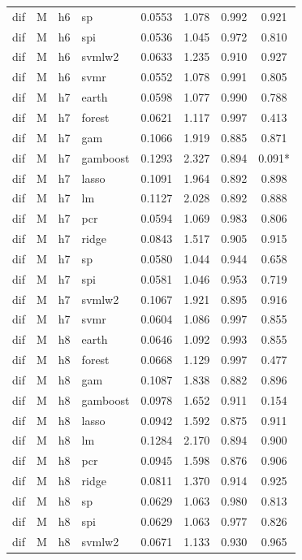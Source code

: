 \begin{ThreePartTable}
\begin{longtable}[t]{llclcccc}
dif & M & h6 & sp & 0.0553 & 1.078 & 0.992 & 0.921\\
dif & M & h6 & spi & 0.0536 & 1.045 & 0.972 & 0.810\\
dif & M & h6 & svmlw2 & 0.0633 & 1.235 & 0.910 & 0.927\\
dif & M & h6 & svmr & 0.0552 & 1.078 & 0.991 & 0.805\\
\addlinespace
dif & M & h7 & earth & 0.0598 & 1.077 & 0.990 & 0.788\\
dif & M & h7 & forest & 0.0621 & 1.117 & 0.997 & 0.413\\
dif & M & h7 & gam & 0.1066 & 1.919 & 0.885 & 0.871\\
dif & M & h7 & gamboost & 0.1293 & 2.327 & 0.894 & 0.091*\\
dif & M & h7 & lasso & 0.1091 & 1.964 & 0.892 & 0.898\\
dif & M & h7 & lm & 0.1127 & 2.028 & 0.892 & 0.888\\
dif & M & h7 & pcr & 0.0594 & 1.069 & 0.983 & 0.806\\
dif & M & h7 & ridge & 0.0843 & 1.517 & 0.905 & 0.915\\
dif & M & h7 & sp & 0.0580 & 1.044 & 0.944 & 0.658\\
dif & M & h7 & spi & 0.0581 & 1.046 & 0.953 & 0.719\\
dif & M & h7 & svmlw2 & 0.1067 & 1.921 & 0.895 & 0.916\\
dif & M & h7 & svmr & 0.0604 & 1.086 & 0.997 & 0.855\\
\addlinespace
dif & M & h8 & earth & 0.0646 & 1.092 & 0.993 & 0.855\\
dif & M & h8 & forest & 0.0668 & 1.129 & 0.997 & 0.477\\
dif & M & h8 & gam & 0.1087 & 1.838 & 0.882 & 0.896\\
dif & M & h8 & gamboost & 0.0978 & 1.652 & 0.911 & 0.154\\
dif & M & h8 & lasso & 0.0942 & 1.592 & 0.875 & 0.911\\
dif & M & h8 & lm & 0.1284 & 2.170 & 0.894 & 0.900\\
dif & M & h8 & pcr & 0.0945 & 1.598 & 0.876 & 0.906\\
dif & M & h8 & ridge & 0.0811 & 1.370 & 0.914 & 0.925\\
dif & M & h8 & sp & 0.0629 & 1.063 & 0.980 & 0.813\\
dif & M & h8 & spi & 0.0629 & 1.063 & 0.977 & 0.826\\
dif & M & h8 & svmlw2 & 0.0671 & 1.133 & 0.930 & 0.965\\

\end{longtable}
\end{ThreePartTable}
